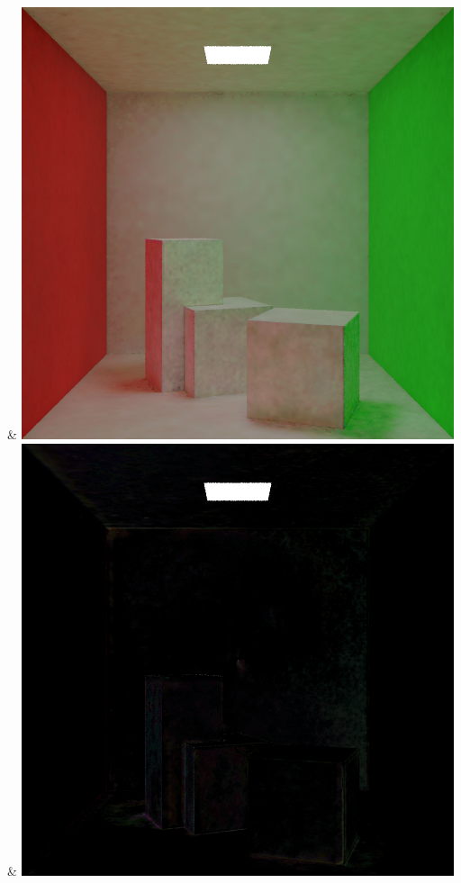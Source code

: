 & \includegraphics[width=\linewidth]{figures/py/tests/quality_comparison/nrc+naive_1spp_diffuse.png}
& \includegraphics[width=\linewidth]{figures/py/tests/quality_comparison/nrc+naive+bal_1spp_diffuse.png}
